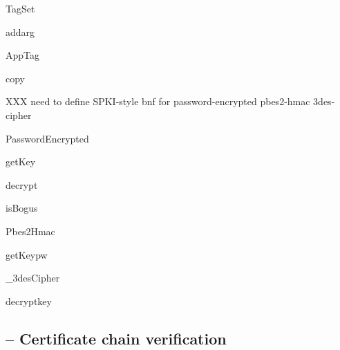 \documentclass{howto}
\begin{document}
\begin{classdesc}{TagSet}{}

\begin{methoddesc}{add}{arg}
\end{methoddesc}

\end{classdesc}

\begin{classdesc}{AppTag}{}

\begin{methoddesc}{copy}{}
\end{methoddesc}

\end{classdesc}

XXX need to define SPKI-style bnf for
password-encrypted
pbes2-hmac
3des-cipher

\begin{classdesc}{PasswordEncrypted}{}

\begin{methoddesc}{getKey}{}
\end{methoddesc}

\begin{methoddesc}{decrypt}{}
\end{methoddesc}

\begin{methoddesc}{isBogus}{}
\end{methoddesc}

\end{classdesc}

\begin{classdesc}{Pbes2Hmac}{}

\begin{methoddesc}{getKey}{pw}
\end{methoddesc}

\end{classdesc}

\begin{classdesc}{_3desCipher}{}

\begin{methoddesc}{decrypt}{key}
\end{methoddesc}

\end{classdesc}

\subsection{
	-- Certificate chain verification}
\end{document}
